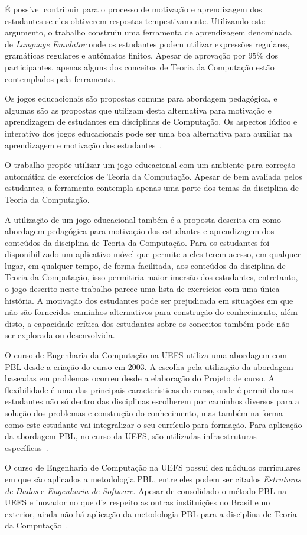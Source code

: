 É possível contribuir para o processo de
motivação e aprendizagem dos estudantes se
eles obtiverem respostas
tempestivamente.
Utilizando este argumento, o
trabalho \cite{vieira2003language} construiu
uma ferramenta de aprendizagem denominada
de \textit{Language Emulator} onde os estudantes
podem utilizar expressões regulares, gramáticas
regulares e autômatos finitos.
Apesar de aprovação por $95\%$ dos
participantes, apenas alguns dos conceitos de Teoria
da Computação estão contemplados pela ferramenta.

Os jogos educacionais são propostas comuns para abordagem
pedagógica, e algumas são as propostas que utilizam
desta alternativa para motivação e aprendizagem
de estudantes em disciplinas de Computação.
Os aspectos lúdico e interativo dos jogos educacionais
pode ser uma boa alternativa para auxiliar na aprendizagem
e motivação dos estudantes~\cite{silva2010automata}.

O trabalho \cite{leite2014montanha} propõe utilizar
um jogo educacional com um ambiente para correção
automática de exercícios de Teoria da Computação.
Apesar de bem avaliada pelos estudantes, a ferramenta
contempla apenas uma parte dos temas da disciplina
de Teoria da Computação.

A utilização de um jogo educacional também é a
proposta descrita em \cite{de2011jogo}
como abordagem pedagógica para motivação dos estudantes
e aprendizagem dos conteúdos da disciplina de Teoria da
Computação.
Para os estudantes foi disponibilizado um aplicativo
móvel que permite a eles terem acesso, em qualquer lugar,
em qualquer tempo, de forma facilitada, aos conteúdos
da disciplina de Teoria da Computação, isso permitiria
maior imersão dos estudantes, entretanto, o jogo
descrito neste trabalho parece uma lista de
exercícios com uma única história.
A motivação dos estudantes pode ser prejudicada
em situações em que não são fornecidos caminhos
alternativos para construção do conhecimento,
além disto, a capacidade crítica dos estudantes
sobre os conceitos também pode não ser explorada
ou desenvolvida.

O curso de Engenharia da Computação na
\ac{UEFS} utiliza uma abordagem com PBL desde a criação
do curso em 2003.
A escolha pela utilização da abordagem baseadas em
problemas ocorreu desde a elaboração do Projeto de curso.
A flexibilidade é uma das principais características do
curso, onde é permitido aos estudantes não só dentro
das disciplinas escolherem por caminhos diversos
para a solução dos problemas e construção do conhecimento,
mas também na forma como este estudante vai integralizar
o seu currículo para formação.
Para aplicação da abordagem \ac{PBL}, no curso da \ac{UEFS},
são utilizadas infraestruturas
específicas~\cite{dos2007aplicaccao, bittencourt2003curriculo}.

O curso de Engenharia de Computação na \ac{UEFS}
possui dez módulos curriculares em que são
aplicados a metodologia PBL, entre eles podem ser citados
\textit{Estruturas de Dados} e
\textit{Engenharia de Software}.
Apesar de consolidado o método PBL na \ac{UEFS}
e inovador no que diz respeito as outras
instituições no Brasil e no exterior,
ainda não há aplicação da metodologia PBL para
a disciplina de Teoria da Computação~\cite{dospensamento}.
